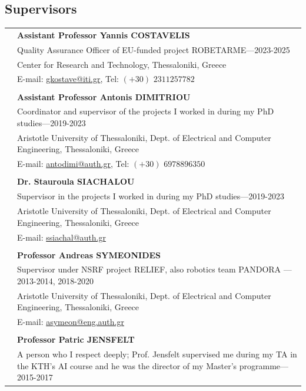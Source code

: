 \documentclass[a4paper,10pt,twoside]{article}
\begin{document}
\subsection*{Supervisors}
\vspace{0.5cm}
\begin{tabular}{rp{14cm}}
& \textbf{Assistant Professor Yannis COSTAVELIS} \\
& {Quality Assurance Officer of EU-funded project ROBETARME}---2023-2025\\
& Center for Research and Technology, Thessaloniki, Greece \\
& E-mail: \href{mailto: gkostave@iti.gr}{gkostave@iti.gr}, Tel: $(+30)$ $2311 257782$ \\
&\\
& \textbf{Assistant Professor Antonis DIMITRIOU} \\
& {Coordinator and supervisor of the projects I worked in during my PhD studies}---2019-2023\\
&Aristotle University of Thessaloniki, Dept. of Electrical and Computer Engineering, Thessaloniki, Greece \\
& E-mail: \href{mailto: antodimi@auth.gr}{antodimi@auth.gr}, Tel: $(+30)$ $697 889 6350$ \\
&\\
& \textbf{Dr. Stauroula SIACHALOU} \\
& {Supervisor in the projects I worked in during my PhD studies}---2019-2023\\
&Aristotle University of Thessaloniki, Dept. of Electrical and Computer Engineering, Thessaloniki, Greece \\
& E-mail: \href{mailto: ssiachal@auth.gr}{ssiachal@auth.gr} \\
&\\
& \textbf{Professor Andreas SYMEONIDES} \\
& {Supervisor under NSRF project RELIEF, also robotics team PANDORA }---2013-2014, 2018-2020\\
&Aristotle University of Thessaloniki, Dept. of Electrical and Computer Engineering, Thessaloniki, Greece \\
& E-mail: \href{mailto: asymeon@eng.auth.gr}{asymeon@eng.auth.gr} \\
&\\
& \textbf{Professor Patric JENSFELT}\\
& {A person who I respect deeply; Prof. Jensfelt supervised me during my TA in the KTH's AI course and he was the director of my Master's programme}---2015-2017\\

\end{tabular}
\end{document}
